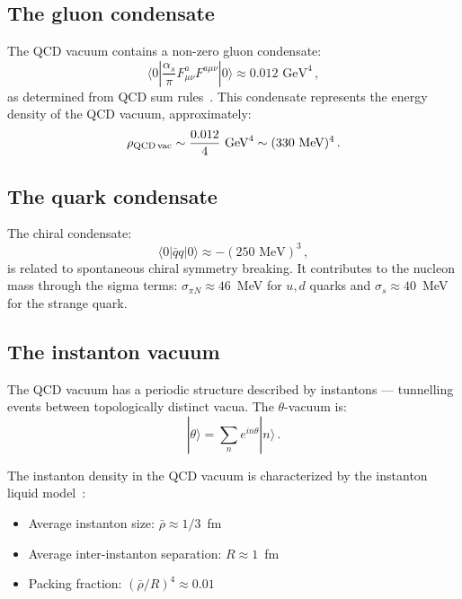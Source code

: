 \documentclass[aps,prd,twocolumn,superscriptaddress,floatfix,nofootinbib]{revtex4-2}
\newcommand{\as}{\alpha_s}
\begin{document}
\subsection{The gluon condensate}

The QCD vacuum contains a non-zero gluon condensate:
\begin{equation}
\langle 0 | \frac{\as}{\pi} F^a_{\mu\nu} F^{a\mu\nu} | 0 \rangle \approx
0.012 \text{ GeV}^4 \, ,
\end{equation}
as determined from QCD sum rules~\cite{SVZ1979}. This condensate represents the
energy density of the QCD vacuum, approximately:
\begin{equation}
\rho_{\rm QCD\,vac} \sim \frac{0.012}{4} \text{ GeV}^4 \sim (330 \text{
MeV})^4 \, .
\end{equation}

\subsection{The quark condensate}

The chiral condensate:
\begin{equation}
\langle 0 | \bar{q} q | 0 \rangle \approx -(250 \text{ MeV})^3 \, ,
\end{equation}
is related to spontaneous chiral symmetry breaking. It contributes to the nucleon
mass through the sigma terms: $\sigma_{\pi N} \approx 46$~MeV for $u,d$ quarks
and $\sigma_s \approx 40$~MeV for the strange quark.

\subsection{The instanton vacuum}

The QCD vacuum has a periodic structure described by instantons --- tunnelling
events between topologically distinct vacua. The $\theta$-vacuum is:
\begin{equation}
|\theta\rangle = \sum_n e^{in\theta} |n\rangle \, .
\end{equation}

The instanton density in the QCD vacuum is characterized by the instanton liquid
model~\cite{Shuryak1982,Diakonov1986}:
\begin{itemize}
\item Average instanton size: $\bar{\rho} \approx 1/3$~fm
\item Average inter-instanton separation: $R \approx 1$~fm
\item Packing fraction: $(\bar{\rho}/R)^4 \approx 0.01$
\end{itemize}
\end{document}
